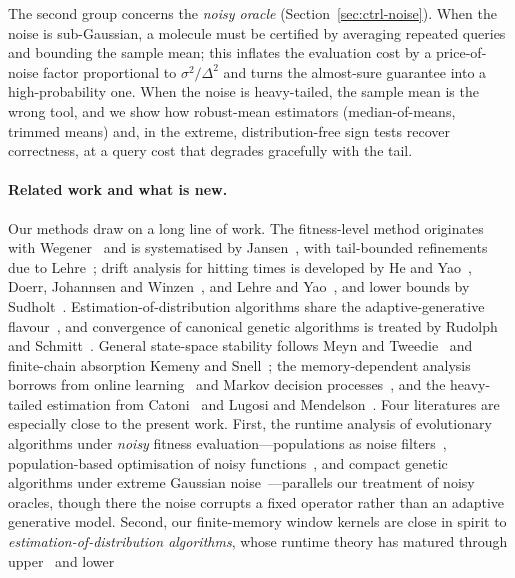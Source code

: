 \documentclass[11pt,a4paper]{article}
\begin{document}
The second group concerns the \emph{noisy oracle}
(Section~\ref{sec:ctrl-noise}).  When the noise is sub-Gaussian, a molecule
must be certified by averaging repeated queries and bounding the sample
mean; this inflates the evaluation cost by a price-of-noise factor
proportional to $\sigma^2/\Delta^2$ and turns the almost-sure guarantee into
a high-probability one.  When the noise is heavy-tailed, the sample mean is
the wrong tool, and we show how robust-mean estimators (median-of-means,
trimmed means) and, in the extreme, distribution-free sign tests recover
correctness, at a query cost that degrades gracefully with the tail.

\paragraph{Related work and what is new.}
Our methods draw on a long line of work.  The fitness-level method originates
with Wegener~\cite{Wegener2001} and is systematised by
Jansen~\cite{Jansen2013}, with tail-bounded refinements due to
Lehre~\cite{Lehre2010}; drift analysis for hitting times is developed by He
and Yao~\cite{HeYao2001}, Doerr, Johannsen and Winzen~\cite{Doerr2012}, and
Lehre and Yao~\cite{LehreYao2012}, and lower bounds by
Sudholt~\cite{Sudholt2013}.  Estimation-of-distribution algorithms share the
adaptive-generative flavour~\cite{HauschildPelikan2011}, and convergence of
canonical genetic algorithms is treated by Rudolph~\cite{Rudolph1994} and
Schmitt~\cite{Schmitt2004}.  General state-space stability follows Meyn and
Tweedie~\cite{MeynTweedie1993} and finite-chain absorption Kemeny and
Snell~\cite{KemenySnell1960}; the memory-dependent analysis borrows from
online learning~\cite{CesaBianchi2006} and Markov decision
processes~\cite{Puterman1994}, and the heavy-tailed estimation from
Catoni~\cite{Catoni2012} and Lugosi and
Mendelson~\cite{LugosiMendelson2019}.  Four literatures are especially close
to the present work.  First, the runtime analysis of evolutionary algorithms
under \emph{noisy} fitness evaluation---populations as noise
filters~\cite{GiessenKotzing2016}, population-based optimisation of noisy
functions~\cite{DangLehre2015}, and compact genetic algorithms under extreme
Gaussian noise~\cite{Friedrich2017}---parallels our treatment of noisy
oracles, though there the noise corrupts a fixed operator rather than an
adaptive generative model.  Second, our finite-memory window kernels are close
in spirit to \emph{estimation-of-distribution algorithms}, whose runtime
theory has matured through upper~\cite{Witt2019} and lower~\cite{KrejcaWitt2020}
\end{document}
